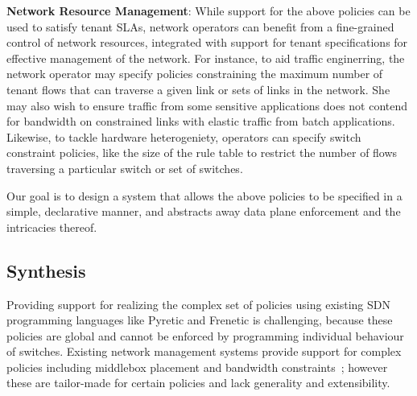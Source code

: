 \textbf{Network Resource Management}: While support for the above
policies can be used to satisfy tenant SLAs, network operators can
benefit from a fine-grained control of network resources, integrated
with support for tenant specifications for effective management of the
network. For instance, to aid traffic enginerring, the network
operator may specify policies constraining the maximum number of
tenant flows that can traverse a given link or sets of links in the
network. She may also wish to ensure traffic from some sensitive
applications does not contend for bandwidth on constrained links with
elastic traffic from batch applications.
  Likewise, to tackle hardware heterogeniety, operators can specify
  switch constraint policies, like the size of the rule table to
  restrict the number of flows traversing a particular switch or set
  of switches.

  Our goal is to design a system that allows the above policies to be
  specified in a simple, declarative manner, and abstracts away 
  data plane enforcement and the intricacies thereof.
  
\subsection{Synthesis} \label{sec:synthesis} 

Providing support for realizing the complex set of policies using
existing SDN programming languages like Pyretic and Frenetic is
challenging, because these policies are global and cannot be enforced
by programming individual behaviour of switches. Existing network
management systems provide support for complex policies including
middlebox placement and bandwidth constraints~\cite{}; however these
are tailor-made for certain policies and lack generality and
extensibility.

